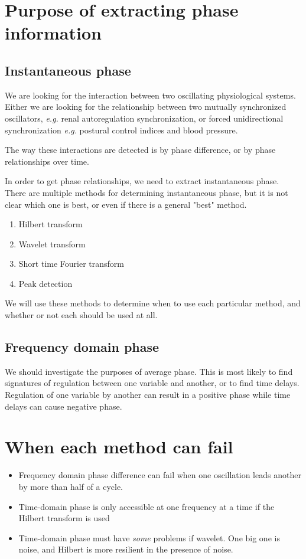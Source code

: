 \documentclass{article}
\begin{document}
\section*{Purpose of extracting phase information}

\subsection*{Instantaneous phase}
We are looking for the interaction between two oscillating physiological systems. Either we are looking for the relationship between two mutually synchronized oscillators, \textit{e.g.} renal autoregulation synchronization, or forced unidirectional synchronization \textit{e.g.} postural control indices and blood pressure. 

The way these interactions are detected is by phase difference, or by phase relationships over time. 

In order to get phase relationships, we need to extract instantaneous phase. There are multiple methods for determining instantaneous phase, but it is not clear which one is best, or even if there is a general "best" method.
\begin{enumerate}
\item Hilbert transform
\item Wavelet transform
\item Short time Fourier transform
\item Peak detection
\end{enumerate}

We will use these methods to determine when to use each particular method, and whether or not each should be used at all.

\subsection*{Frequency domain phase}

We should investigate the purposes of average phase. This is most likely to find signatures of regulation between one variable and another, or to find time delays. Regulation of one variable by another can result in a positive phase while time delays can cause negative phase.

\section*{When each method can fail}
\begin{itemize}
\item Frequency domain phase difference can fail when one oscillation leads another by more than half of a cycle.
\item Time-domain phase is only accessible at one frequency at a time if the Hilbert transform is used
\item Time-domain phase must have \textit{some} problems if wavelet. One big one is noise, and Hilbert is more resilient in the presence of noise.
\end{itemize}
\end{document}
